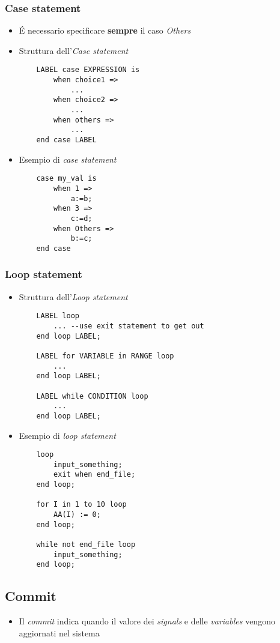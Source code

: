 \documentclass{article}
\begin{document}
\subsubsection{Case statement}
\begin{itemize}
  \item \'E necessario specificare \textbf{sempre} il caso \textit{Others}
  \item Struttura dell'\textit{Case statement}
        \begin{verbatim}
    LABEL case EXPRESSION is
        when choice1 =>
            ...
        when choice2 =>
            ...
        when others =>
            ...
    end case LABEL
	      \end{verbatim}
  \item Esempio di \textit{case statement}
        \begin{verbatim}
    case my_val is
        when 1 =>
            a:=b;
        when 3 =>
            c:=d;
        when Others =>
            b:=c;
    end case
	      \end{verbatim}
\end{itemize}

\newpage

\subsubsection{Loop statement}
\begin{itemize}
  \item Struttura dell'\textit{Loop statement}
        \begin{verbatim}
    LABEL loop
        ... --use exit statement to get out
    end loop LABEL;

    LABEL for VARIABLE in RANGE loop
        ...
    end loop LABEL;

    LABEL while CONDITION loop
        ...
    end loop LABEL;
	      \end{verbatim}
  \item Esempio di \textit{loop statement}
        \begin{verbatim}
    loop
        input_something;
        exit when end_file;
    end loop;

    for I in 1 to 10 loop
        AA(I) := 0;
    end loop;

    while not end_file loop
        input_something;
    end loop;
	      \end{verbatim}
\end{itemize}

\subsection{Commit}
\begin{itemize}
  \item Il \textit{commit} indica quando il valore dei \textit{signals} e delle \textit{variables} vengono aggiornati nel sistema
\end{itemize}
\end{document}
